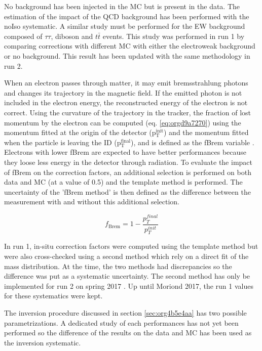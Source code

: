 No background has been injected in the MC but is present in the data.
The estimation of the impact of the QCD background has been performed with the noIso systematic.
A similar study must be performed for the EW background composed of \(\tau \tau\), diboson and \(t\bar{t}\) events.
This study was performed in run 1 by comparing corrections with different MC with either the electroweak background or no background.
This result has been updated with the same methodology in run 2.

When an electron passes through matter, it may emit bremsstrahlung photons and changes its trajectory in the magnetic field.
If the emitted photon is not included in the electron energy, the reconstructed energy of the electron is not correct.
Using the curvature of the trajectory in the tracker, the fraction of lost momentum by the electron can be computed (eq. \ref{eq:orgd9a7270}) using the momentum fitted at the origin of the detector (p\(_{\text{T}}^{\text{init}}\)) and the momentum fitted when the particle is leaving the ID (p\(_{\text{T}}^{\text{final}}\)), and is defined as the fBrem variable \cite{ATL-COM-PHYS-2013-1653}.
Electrons with lower fBrem are expected to have better performances because they loose less energy in the detector through radiation.
To evaluate the impact of fBrem on the correction factors, an additional selection is performed on both data and MC (at a value of 0.5) and the template method is performed.
The uncertainty of the 'fBrem method' is then defined as the difference between the measurement with and without this additional selection.

\begin{equation}
\label{eq:orgd9a7270}
f_{\text{Brem}} = 1 - \frac{p_T^{final}}{p_T^{init}}
\end{equation}

In run 1, in-situ correction factors were computed using the template method but were also cross-checked using a second method which rely on a direct fit of the mass distribution.
At the time, the two methods had discrepancies so the difference was put as a systematic uncertainty.
The second method has only be implemented for run 2 on spring 2017 \cite{ATL-COM-PHYS-2017-757}.
Up until Moriond 2017, the run 1 values for these systematics were kept.

The inversion procedure discussed in section \ref{sec:org4b5e4aa} has two possible para\-me\-tri\-zations.
A dedicated study of each performances has not yet been performed so the difference of the results on the data and MC has been used as the inversion systematic.

